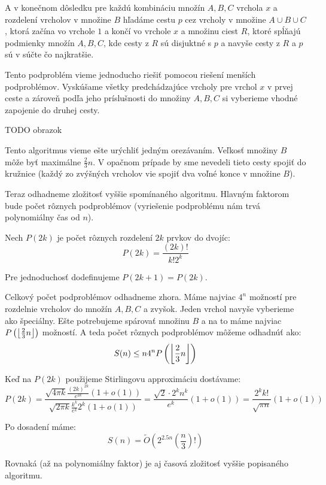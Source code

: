A v konečnom dôsledku pre každú kombináciu množín $A, B, C$ vrchola $x$ a rozdelení
vrcholov v množine $B$ hľadáme cestu $p$ cez vrcholy v množine $A \cup B \cup C$, ktorá
začína vo vrchole $1$ a končí vo vrchole $x$ a množinu ciest $R$, ktoré
spĺňajú podmienky množín $A, B, C$, kde cesty z $R$ sú disjuktné s $p$ a navyše cesty
z $R$ a $p$ sú v súčte čo najkratšie.

Tento podproblém vieme jednoducho riešiť pomocou riešení menších podproblémov.
Vyskúšame všetky predchádzajúce vrcholy pre vrchol $x$ v prvej ceste a zároveň podľa jeho
príslušnosti do množiny $A, B, C$ si vyberieme vhodné zapojenie do druhej cesty.

TODO obrazok


Tento algoritmus vieme ešte urýchliť jedným orezávaním. Veľkosť množiny
$B$ môže byť maximálne $\frac{2}{3}n$. V opačnom prípade by sme nevedeli tieto
cesty spojiť do kružnice (každý zo zvýšných vrcholov vie spojiť dva voľné konce
v množine $B$).

Teraz odhadneme zložitosť vyššie spomínaného algoritmu. Hlavným faktorom bude počet rôznych
podproblémov (vyriešenie podproblému nám trvá polynomiálny čas od $n$).

Nech $P(2k)$ je počet rôznych rozdelení $2k$ prvkov do dvojíc:
$$P(2k) = \frac{(2k)!}{k! 2^k}$$

Pre jednoduchosť dodefinujeme $P(2k+1) = P(2k)$.

%
%

Celkový počet podproblémov odhadneme zhora. Máme najviac $4^n$ možností pre rozdelnie
vrcholov do množín $A, B, C$ a zvyšok. Jeden vrchol navyše vyberieme ako špeciálny.
Ešte potrebujeme spárovať množinu $B$ a na to máme najviac $P\left(\floor*{\frac{2}{3}n}\right)$
možností. A teda počet rôznych podproblémov môžeme odhadnúť ako:
$$S(n) \leq n 4^n P\left(\floor*{\frac{2}{3}n}\right)$$

Keď na $P(2k)$ použijeme Stirlingovu approximáciu dostávame:
$$P(2k) = \frac{\sqrt{4\pi k}\frac{(2k)^{2k}}{e^{2k}} (1 + o(1))}
{\sqrt{2\pi k}\frac{k^{k}}{e^{k}} 2^k (1 + o(1))} =
\frac{\sqrt{2} \cdot{}2^k n^k}{e^k} (1 + o(1)) =
\frac{2^k k!}{\sqrt{\pi n}} (1 + o(1)) $$

Po dosadení máme:
$$S(n) = \tilde{O}\left(2^{2.5n} \left(\frac{n}{3}\right)!\right)$$

Rovnaká (až na polynomiálny faktor) je aj časová zložitosť vyššie popisaného algoritmu.
